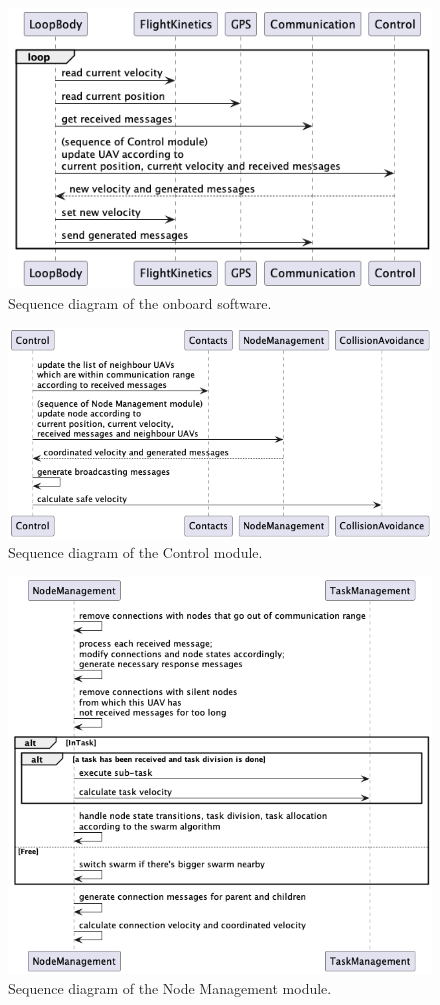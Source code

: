 \begin{figure}[htbp]
  \centering
  \includegraphics[width=0.8\linewidth]{rsc/astro_sequence.png}
  \caption
  {Sequence diagram of the onboard software.}
  \label{fig:seq_sftwr}
\end{figure}

\begin{figure}[htbp]
  \centering
  \includegraphics[width=0.9\linewidth]{rsc/control_sequence.png}
  \caption
  {Sequence diagram of the Control module.}
  \label{fig:seq_control}
\end{figure}

\begin{figure}[htbp]
  \centering
  \includegraphics[width=0.9\linewidth]{rsc/nm_sequence.png}
  \caption
  {Sequence diagram of the Node Management module.}
  \label{fig:seq_nm}
\end{figure}